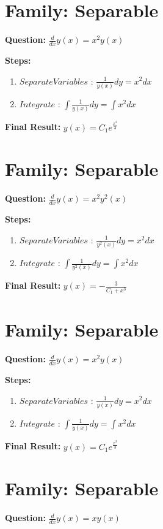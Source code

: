 \documentclass{article}
\begin{document}
\section*{Family: Separable}
\textbf{Question:} $\frac{d}{d x} y{\left(x \right)} = x^{2} y{\left(x \right)}$

\textbf{Steps:}
\begin{enumerate}
\item $Separate Variables$ :  $\frac{1}{y{\left(x \right)}} dy = x^{2} dx$
\item $Integrate$ :  $\int \frac{1}{y{\left(x \right)}} dy = \int x^{2} dx$
\end{enumerate}
\textbf{Final Result:} $y{\left(x \right)} = C_{1} e^{\frac{x^{3}}{3}}$

\section*{Family: Separable}
\textbf{Question:} $\frac{d}{d x} y{\left(x \right)} = x^{2} y^{2}{\left(x \right)}$

\textbf{Steps:}
\begin{enumerate}
\item $Separate Variables$ :  $\frac{1}{y^{2}{\left(x \right)}} dy = x^{2} dx$
\item $Integrate$ :  $\int \frac{1}{y^{2}{\left(x \right)}} dy = \int x^{2} dx$
\end{enumerate}
\textbf{Final Result:} $y{\left(x \right)} = - \frac{3}{C_{1} + x^{3}}$

\section*{Family: Separable}
\textbf{Question:} $\frac{d}{d x} y{\left(x \right)} = x^{2} y{\left(x \right)}$

\textbf{Steps:}
\begin{enumerate}
\item $Separate Variables$ :  $\frac{1}{y{\left(x \right)}} dy = x^{2} dx$
\item $Integrate$ :  $\int \frac{1}{y{\left(x \right)}} dy = \int x^{2} dx$
\end{enumerate}
\textbf{Final Result:} $y{\left(x \right)} = C_{1} e^{\frac{x^{3}}{3}}$

\section*{Family: Separable}
\textbf{Question:} $\frac{d}{d x} y{\left(x \right)} = x y{\left(x \right)}$
\end{document}
